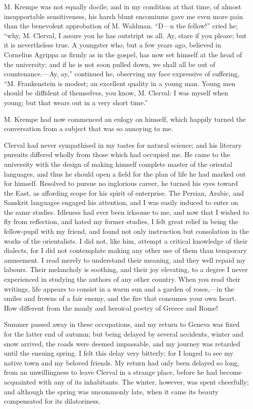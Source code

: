 \documentclass[12pt,openright]{book}
\begin{document}
M. Krempe was not equally docile; and in my condition at that time, of almost insupportable sensitiveness, his harsh blunt encomiums gave me even more pain than the benevolent approbation of M. Waldman. “D—n the fellow!” cried he; “why, M. Clerval, I assure you he has outstript us all. Ay, stare if you please; but it is nevertheless true. A youngster who, but a few years ago, believed in Cornelius Agrippa as firmly as in the gospel, has now set himself at the head of the university; and if he is not soon pulled down, we shall all be out of countenance.—Ay, ay,” continued he, observing my face expressive of suffering, “M. Frankenstein is modest; an excellent quality in a young man. Young men should be diffident of themselves, you know, M. Clerval: I was myself when young; but that wears out in a very short time.”

M. Krempe had now commenced an eulogy on himself, which happily turned the conversation from a subject that was so annoying to me.

Clerval had never sympathised in my tastes for natural science; and his literary pursuits differed wholly from those which had occupied me. He came to the university with the design of making himself complete master of the oriental languages, and thus he should open a field for the plan of life he had marked out for himself. Resolved to pursue no inglorious career, he turned his eyes toward the East, as affording scope for his spirit of enterprise. The Persian, Arabic, and Sanskrit languages engaged his attention, and I was easily induced to enter on the same studies. Idleness had ever been irksome to me, and now that I wished to fly from reflection, and hated my former studies, I felt great relief in being the fellow-pupil with my friend, and found not only instruction but consolation in the works of the orientalists. I did not, like him, attempt a critical knowledge of their dialects, for I did not contemplate making any other use of them than temporary amusement. I read merely to understand their meaning, and they well repaid my labours. Their melancholy is soothing, and their joy elevating, to a degree I never experienced in studying the authors of any other country. When you read their writings, life appears to consist in a warm sun and a garden of roses,—in the smiles and frowns of a fair enemy, and the fire that consumes your own heart. How different from the manly and heroical poetry of Greece and Rome!

Summer passed away in these occupations, and my return to Geneva was fixed for the latter end of autumn; but being delayed by several accidents, winter and snow arrived, the roads were deemed impassable, and my journey was retarded until the ensuing spring. I felt this delay very bitterly; for I longed to see my native town and my beloved friends. My return had only been delayed so long, from an unwillingness to leave Clerval in a strange place, before he had become acquainted with any of its inhabitants. The winter, however, was spent cheerfully; and although the spring was uncommonly late, when it came its beauty compensated for its dilatoriness.
\end{document}
